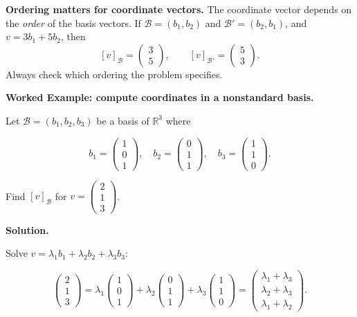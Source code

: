 \begin{commonmistake}
\textbf{Ordering matters for coordinate vectors.}
The coordinate vector depends on the \emph{order} of the basis vectors.
If $\mathcal{B}=(b_1,b_2)$ and $\mathcal{B}'=(b_2,b_1)$, and $v=3b_1+5b_2$, then
\[
[v]_{\mathcal{B}}=\begin{pmatrix}3\\5\end{pmatrix},
\qquad
[v]_{\mathcal{B}'}=\begin{pmatrix}5\\3\end{pmatrix}.
\]
Always check which ordering the problem specifies.
\end{commonmistake}

\begin{examplebox}

\textbf{Worked Example: compute coordinates in a nonstandard basis.}

Let $\mathcal{B}=(b_1,b_2,b_3)$ be a basis of $\mathbb{R}^3$ where

\[
b_1=\begin{pmatrix}1\\0\\1\end{pmatrix},\quad
b_2=\begin{pmatrix}0\\1\\1\end{pmatrix},\quad
b_3=\begin{pmatrix}1\\1\\0\end{pmatrix}.
\]

Find $[v]_{\mathcal{B}}$ for $v=\begin{pmatrix}2\\1\\3\end{pmatrix}$.

\medskip

\textbf{Solution.}

Solve $v=\lambda_1 b_1+\lambda_2 b_2+\lambda_3 b_3$:

\[
\begin{pmatrix}2\\1\\3\end{pmatrix}
=
\lambda_1\begin{pmatrix}1\\0\\1\end{pmatrix}
+\lambda_2\begin{pmatrix}0\\1\\1\end{pmatrix}
+\lambda_3\begin{pmatrix}1\\1\\0\end{pmatrix}
=
\begin{pmatrix}\lambda_1+\lambda_3\\ \lambda_2+\lambda_3\\ \lambda_1+\lambda_2\end{pmatrix}.
\]


\end{examplebox}
